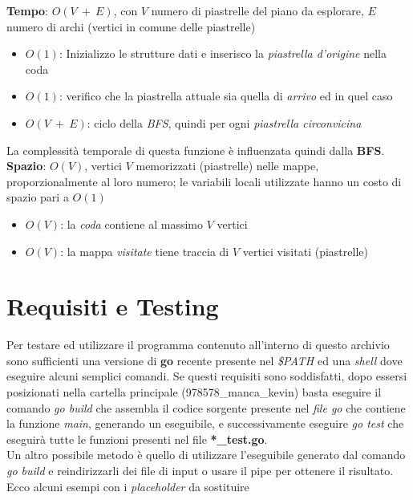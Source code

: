 \documentclass{article}
\begin{document}
\textbf{Tempo}: \(O(V\ +\ E)\), con \(V\) numero di piastrelle del piano da esplorare, \(E\) numero di archi (vertici in comune delle piastrelle)\\
\begin{itemize}
  \item \(O(1)\): Inizializzo le strutture dati e inserisco la \textit{piastrella d'origine} nella coda
  \item \(O(1)\): verifico che la piastrella attuale sia quella di \textit{arrivo} ed in quel caso 
  \item \(O(V\ +\ E)\): ciclo della \textit{BFS}, quindi per ogni \textit{piastrella circonvicina}
\end{itemize}
La complessità temporale di questa funzione è influenzata quindi dalla \textbf{BFS}.\\
\textbf{Spazio}: \(O(V)\), vertici \(V\) memorizzati (piastrelle) nelle mappe, proporzionalmente al loro numero; le variabili locali utilizzate hanno un costo di spazio pari a \(O(1)\)\\
\begin{itemize}
  \item \(O(V)\): la \textit{coda} contiene al massimo \(V\) vertici
  \item \(O(V)\): la mappa \textit{visitate} tiene traccia di \(V\) vertici visitati (piastrelle)
\end{itemize}

\section{Requisiti e Testing}
Per testare ed utilizzare il programma contenuto all'interno di questo archivio sono sufficienti una versione di \textbf{go} recente presente nel \textit{\$PATH} ed una \textit{shell} dove eseguire alcuni semplici comandi.
Se questi requisiti sono soddisfatti, dopo essersi posizionati nella cartella principale (978578\_manca\_kevin) basta eseguire il comando \textit{go build} che assembla il codice sorgente presente nel \textit{file go} che contiene la funzione \textit{main}, generando un eseguibile, e successivamente eseguire \textit{go test} che eseguirà tutte le funzioni presenti nel file \textbf{*\_test.go}.\\
Un altro possibile metodo è quello di utilizzare l'eseguibile generato dal comando \textit{go build} e reindirizzarli dei file di input o usare il pipe per ottenere il risultato.
Ecco alcuni esempi con i \textit{placeholder} da sostituire
\end{document}
